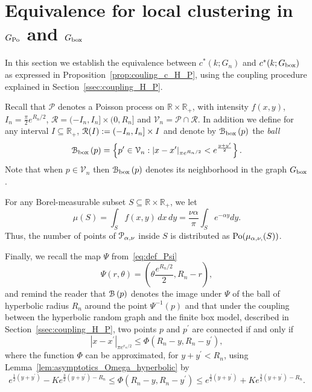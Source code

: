 \section{Equivalence for local clustering in $G_{\text{Po}}$ and $G_{\text{box}}$}\label{sec:coupling_H_P_n}

In this section we establish the equivalence between $c^\ast(k; G_n)$ and $c^\ast(k; G_{\text{box}})$ as expressed in Proposition~\ref{prop:couling_c_H_P}, using the coupling procedure explained in Section~\ref{ssec:coupling_H_P}. 

Recall that $\mathcal{P}$ denotes a Poisson process on $\mathbb{R} \times \mathbb{R}_+$, with intensity $f(x,y)$, $I_n = \frac{\pi}{2}e^{R_n/2}$, $\mathcal{R} = (-I_n, I_n] \times (0,R_n]$ and $\mathcal{V}_n = \mathcal{P}\cap \mathcal{R}$. In addition we define for any interval $I \subseteq \mathbb{R}_+$, ${\mathcal R}(I) := (-I_n,I_n] \times I$ and denote by ${\mathcal B}_{\text{box}}\left(p\right)$ the \emph{ball}
\[
	{\mathcal B}_{\text{box}}\left(p\right) = \left\{p^\prime \in \mathcal{V}_n : |x - x^\prime |_{\pi e^{R_n/2}} < e^{\frac{y+y^\prime}{2}}\right\}.
\]
Note that when $p \in \mathcal{V}_n$ then ${\mathcal B}_{\text{box}}\left(p\right)$ denotes its neighborhood in the graph $G_{\text{box}}$. 

For any Borel-measurable subset $S \subseteq \mathbb{R} \times \mathbb{R}_+$, we let 
\[
	\mu (S) = \int_S f(x,y) \, dx \, dy = \frac{\nu \alpha}{\pi}\int_S e^{-\alpha y}dy.
\]
Thus, the number of points of ${\mathcal P}_{\alpha, \nu}$ inside $S$ is distributed as ${\mathrm{Po}} ({\mu_{\alpha, \nu,} (S)})$.

Finally, we recall the map $\Psi$ from~\eqref{eq:def_Psi}
\[
	\Psi(r,\theta) = \left(\theta \frac{e^{R_n/2}}{2}, R_n - r\right),
\] 
and remind the reader that ${\mathcal B}\left(p\right)$ denotes the image under $\Psi$ of the ball of hyperbolic radius $R_n$ around the point $\Psi^{-1}(p)$ and that under the coupling between the hyperbolic random graph and the finite box model, described in Section~\ref{ssec:coupling_H_P}, two points $p$ and $p^\prime$ are connected if and only if
\[
	|x-x^\prime|_{\pi e^{r_n/2}} \le \Phi(R_n - y, R_n - y^\prime),
\]
where the function $\Phi$ can be approximated, for $y + y^\prime < R_n$, using Lemma~\ref{lem:asymptotics_Omega_hyperbolic} by  
\[
	e^{\frac{1}{2}(y+y^\prime)} - K e^{\frac{3}{2}(y+y^\prime) - R_n} \leq \Phi(R_n - y, R_n - y^\prime) 
		\leq  e^{\frac{1}{2}(y+y^\prime)} + K e^{\frac{3}{2}(y+y^\prime) - R_n}.
\]

